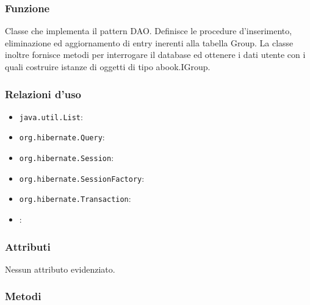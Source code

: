 \subsubsection*{Funzione}
Classe che implementa il pattern DAO. Definisce le procedure d’inserimento, eliminazione ed aggiornamento di entry inerenti alla tabella Group. La classe inoltre fornisce metodi per interrogare il database ed ottenere i dati utente con i quali costruire istanze di oggetti di tipo abook.IGroup.

\subsubsection*{Relazioni d'uso}

\begin{itemize}
	\item \texttt{java.util.List}:
	\item \texttt{org.hibernate.Query}:
	\item \texttt{org.hibernate.Session}:
	\item \texttt{org.hibernate.SessionFactory}:
	\item \texttt{org.hibernate.Transaction}:
	\item {}:
\end{itemize}

\subsubsection*{Attributi}

Nessun attributo evidenziato.

\subsubsection*{Metodi}

